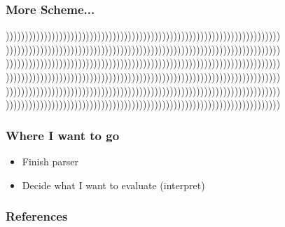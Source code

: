 \documentclass{beamer}
\begin{document}
\begin{frame}
\frametitle{More Scheme...}
))))))))))))))))))))))))))))))))))))))))))))))))))))))))))))))))))))))))
))))))))))))))))))))))))))))))))))))))))))))))))))))))))))))))))))))))))
))))))))))))))))))))))))))))))))))))))))))))))))))))))))))))))))))))))))
))))))))))))))))))))))))))))))))))))))))))))))))))))))))))))))))))))))))
))))))))))))))))))))))))))))))))))))))))))))))))))))))))))))))))))))))))
))))))))))))))))))))))))))))))))))))))))))))))))))))))))))))))))))))))))
\end{frame}

\begin{frame}
\frametitle{Where I want to go}
    \begin{itemize}
        \item Finish parser
        \item Decide what I want to evaluate (interpret)
    \end{itemize}
\end{frame}

\begin{frame}[allowframebreaks]
\frametitle{References}


\end{frame}
\end{document}
